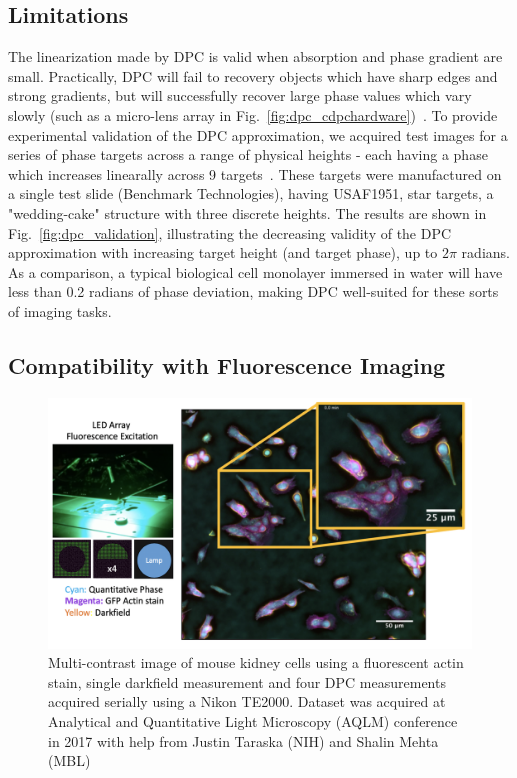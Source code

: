 \subsection{Limitations}
The linearization made by DPC is valid when absorption and phase gradient are small. Practically, DPC will fail to recovery objects which have sharp edges and strong gradients, but will successfully recover large phase values which vary slowly (such as a micro-lens array in Fig.~\ref{fig:dpc_cdpchardware})~\cite{Claus2015, chen2018quantitative}. To provide experimental validation of the DPC approximation, we acquired test images for a series of phase targets across a range of physical heights - each having a phase which increases linearally across 9 targets~\cite{phillipstechnical}. These targets were manufactured on a single test slide (Benchmark Technologies), having USAF1951, star targets, a "wedding-cake" structure with three discrete heights. The results are shown in Fig.~\ref{fig:dpc_validation}, illustrating the decreasing validity of the DPC approximation with increasing target height (and target phase), up to $2\pi$ radians. As a comparison, a typical biological cell monolayer immersed in water will have less than 0.2 radians of phase deviation, making DPC well-suited for these sorts of imaging tasks.


\subsection{Compatibility with Fluorescence Imaging}

\begin{figure}[tbh]
\centering
\includegraphics[width=\textwidth]{figures/fig_fabrication_dome_multi.png}
\caption{\label{fig:dpc_multi} Multi-contrast image of mouse kidney cells using a fluorescent actin stain, single darkfield measurement and four DPC measurements acquired serially using a Nikon TE2000. Dataset was acquired at Analytical and Quantitative Light Microscopy (AQLM) conference in 2017 with help from Justin Taraska (NIH) and Shalin Mehta (MBL)}
\end{figure}

